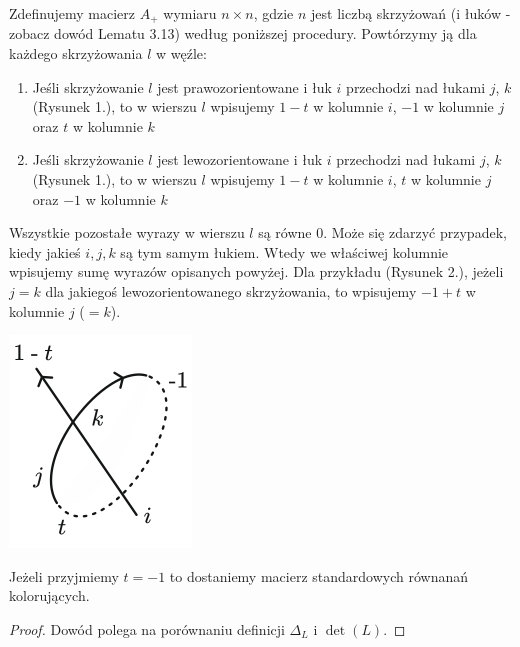 \begin{definicja}
   Zdefinujemy macierz $A_+$ wymiaru $n \times n$, gdzie $n$ jest liczbą skrzyżowań (i łuków - zobacz dowód Lematu 3.13) według poniższej procedury. Powtórzymy
   ją dla każdego skrzyżowania $l$ w węźle:

   \begin{enumerate}
   \item Jeśli skrzyżowanie $l$ jest prawozorientowane i łuk $i$ przechodzi nad łukami $j$, $k$ (Rysunek 1.), to w wierszu $l$ wpisujemy $1 - t$ w kolumnie $i$, $-1$ w kolumnie $j$ oraz $t$ w kolumnie $k$
   \item Jeśli skrzyżowanie $l$ jest lewozorientowane i łuk $i$ przechodzi nad łukami $j$, $k$ (Rysunek 1.), to w wierszu $l$ wpisujemy $1-t$ w kolumnie $i$, $t$ w kolumnie $j$ oraz $-1$ w kolumnie $k$
   \end{enumerate}

   Wszystkie pozostałe wyrazy w wierszu $l$ są równe 0. Może się zdarzyć przypadek, kiedy jakieś $i, j, k$ są tym samym łukiem. Wtedy we właściwej kolumnie wpisujemy sumę wyrazów opisanych powyżej.
   Dla przykładu (Rysunek 2.), jeżeli $j=k$ dla jakiegoś lewozorientowanego skrzyżowania, to wpisujemy $-1+t$ w kolumnie $j$ ($=k$).

   \begin{center}
      \includegraphics[scale=0.5]{3/images/2}
   \end{center}
\end{definicja}

\begin{wniosek}
   Jeżeli przyjmiemy $t = -1$ to dostaniemy macierz standardowych równanań kolorujących.
\end{wniosek}

\begin{proof}
   Dowód polega na porównaniu definicji $\Delta_L$ i $\det(L)$.
\end{proof}

